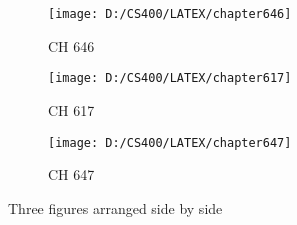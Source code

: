 \documentclass{article}
\begin{document}
	
	\begin{figure}
		\centering
		\begin{subfigure}{0.44\linewidth}
			\texttt{[image: D:/CS400/LATEX/chapter646]}
			\caption{CH 646}
			\label{fig:subfig1}
		\end{subfigure}
		\hfill
		\begin{subfigure}{0.44\linewidth}
			\texttt{[image: D:/CS400/LATEX/chapter617]}
			\caption{CH 617}
			\label{fig:subfig2}
		\end{subfigure}
		\hfill
		\begin{subfigure}{0.44\linewidth}
			\texttt{[image: D:/CS400/LATEX/chapter647]}
			\caption{CH 647}
			\label{fig:subfig3}
		\end{subfigure}
		\caption{Three figures arranged side by side}
		\label{figure:sunfigure}
	\end{figure}
	
\end{document}
